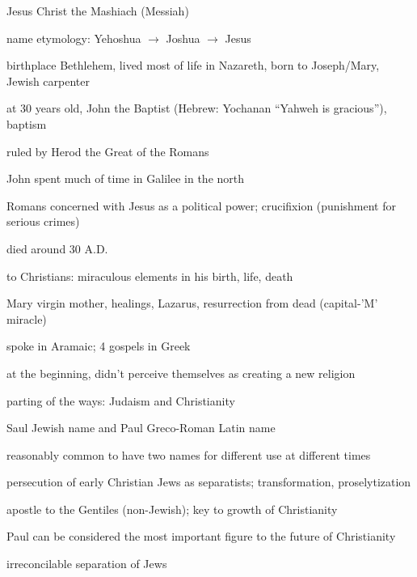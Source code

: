 \documentclass[12pt]{article}
\begin{document}
\noindent
Jesus Christ the Mashiach (Messiah)

name etymology: Yehoshua $\to$ Joshua $\to$ Jesus

birthplace Bethlehem, lived most of life in Nazareth, born to Joseph/Mary, Jewish carpenter

at 30 years old, John the Baptist (Hebrew: Yochanan ``Yahweh is gracious''), baptism

ruled by Herod the Great of the Romans

John spent much of time in Galilee in the north

Romans concerned with Jesus as a political power; crucifixion (punishment for serious crimes)

died around 30 A.D.

to Christians: miraculous elements in his birth, life, death

Mary virgin mother, healings, Lazarus, resurrection from dead (capital-'M' miracle)

spoke in Aramaic; 4 gospels in Greek

at the beginning, didn't perceive themselves as creating a new religion

parting of the ways: Judaism and Christianity

Saul Jewish name and Paul Greco-Roman Latin name

reasonably common to have two names for different use at different times

persecution of early Christian Jews as separatists; transformation, proselytization

apostle to the Gentiles (non-Jewish); key to growth of Christianity

Paul can be considered the most important figure to the future of Christianity

irreconcilable separation of Jews

 
\end{document}
